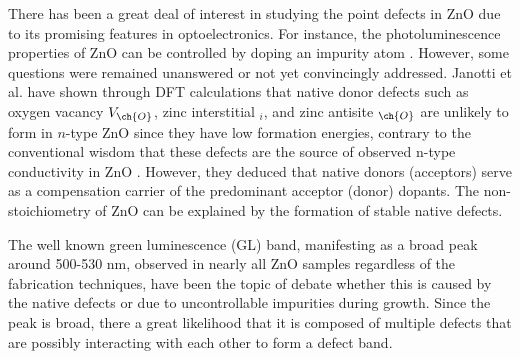 There has been a great deal of interest in studying the point defects in ZnO due to its promising features in optoelectronics. For instance, the photoluminescence properties of ZnO can be controlled by doping an impurity atom \citep{Musavi2019}.  However, some questions were remained unanswered or not yet convincingly addressed. Janotti et al. \citep{Janotti2007} have shown through DFT calculations that native donor defects such as oxygen vacancy $V_{\ch{O}}$, zinc interstitial $_i$, and zinc antisite $_{\ch{O}}$  are unlikely to form in $n$-type ZnO since they have low formation energies, contrary to the conventional wisdom that these defects are the source of  observed n-type conductivity in ZnO \citep{Harrison1954,Thomas1957,Hausmann1973,Hagemark1976}. However, they deduced that native donors (acceptors) serve as a compensation carrier of the predominant acceptor (donor) dopants.  The non-stoichiometry of ZnO can be explained by the formation of stable native defects. 


 The well known green luminescence (GL) band, manifesting as a broad peak around 500-530 nm,  observed in nearly all ZnO samples regardless of the fabrication techniques, have been the topic of debate whether this is caused by the native defects or due to uncontrollable impurities during growth. Since the peak is  broad, there a great likelihood that it is composed of multiple defects that are possibly interacting with each other to form a defect band. 






 